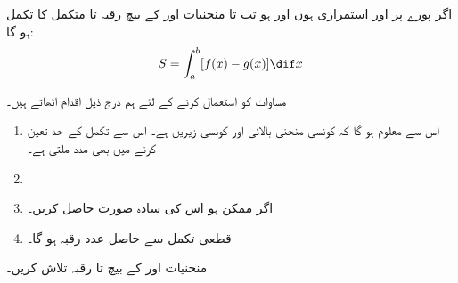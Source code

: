 اگر پورے  پر  اور  استمراری ہوں اور  ہو تب  تا  منحنیات  اور  کے بیچ رقبہ  تا  متکمل  کا تکمل ہو گا:
\begin{align}\label{مساوات_تکمل_استعمال_رقبہ_تعریف}
S=\int_a^b[f(x)-g(x)]\dif x
\end{align}  

مساوات  کو استعمال کرنے کے لئے ہم درج ذیل اقدام اٹھاتے ہیں۔

\begin{enumerate}[1.]
\item
{} اس سے معلوم ہو گا کہ کونسی منحنی بالائی  اور کونسی زیریں  ہے۔ اس سے تکمل کے حد تعین کرنے میں بھی مدد ملتی ہے۔
\item
{}
\item
{} اگر ممکن ہو اس کی سادہ صورت حاصل کریں۔
\item
{} قطعی تکمل سے حاصل عدد رقبہ ہو گا۔
\end{enumerate}

منحنیات  اور  کے بیچ  تا  رقبہ تلاش کریں۔

